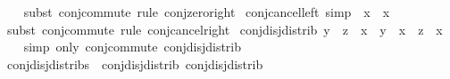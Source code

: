 \begin{isabellebody}
%
\isadelimproof
\ \ %
\endisadelimproof
%
\isatagproof
{}\isamarkupfalse%
\ {\isacharparenleft}{\kern0pt}subst\ conj{\isachardot}{\kern0pt}commute{\isacharparenright}{\kern0pt}\ {\isacharparenleft}{\kern0pt}rule\ conj{\isacharunderscore}{\kern0pt}zero{\isacharunderscore}{\kern0pt}right{\isacharparenright}{\kern0pt}%
\endisatagproof
{\isafoldproof}%
%
\isadelimproof
\isanewline
%
\endisadelimproof
\isanewline
{}\isamarkupfalse%
\ conj{\isacharunderscore}{\kern0pt}cancel{\isacharunderscore}{\kern0pt}left\ {\isacharbrackleft}{\kern0pt}simp{\isacharbrackright}{\kern0pt}{\isacharcolon}{\kern0pt}\ {\isachardoublequoteopen}\isactrlbold {\isacharminus}{\kern0pt}\ x\ \isactrlbold {\isasymsqinter}\ x\ {\isacharequal}{\kern0pt}\ \isanewline
%
\isadelimproof
\ \ %
\endisadelimproof
%
\isatagproof
{}\isamarkupfalse%
\ {\isacharparenleft}{\kern0pt}subst\ conj{\isachardot}{\kern0pt}commute{\isacharparenright}{\kern0pt}\ {\isacharparenleft}{\kern0pt}rule\ conj{\isacharunderscore}{\kern0pt}cancel{\isacharunderscore}{\kern0pt}right{\isacharparenright}{\kern0pt}%
\endisatagproof
{\isafoldproof}%
%
\isadelimproof
\isanewline
%
\endisadelimproof
\isanewline
{}\isamarkupfalse%
\ conj{\isacharunderscore}{\kern0pt}disj{\isacharunderscore}{\kern0pt}distrib{}{\isacharcolon}{\kern0pt}\ {\isachardoublequoteopen}{\isacharparenleft}{\kern0pt}y\ \isactrlbold {\isasymsqunion}\ z{\isacharparenright}{\kern0pt}\ \isactrlbold {\isasymsqinter}\ x\ {\isacharequal}{\kern0pt}\ {\isacharparenleft}{\kern0pt}y\ \isactrlbold {\isasymsqinter}\ x{\isacharparenright}{\kern0pt}\ \isactrlbold {\isasymsqunion}\ {\isacharparenleft}{\kern0pt}z\ \isactrlbold {\isasymsqinter}\ x{\isacharparenright}{\kern0pt}{\isachardoublequoteclose}\isanewline
%
\isadelimproof
\ \ %
\endisadelimproof
%
\isatagproof
{}\isamarkupfalse%
\ {\isacharparenleft}{\kern0pt}simp\ only{\isacharcolon}{\kern0pt}\ conj{\isachardot}{\kern0pt}commute\ conj{\isacharunderscore}{\kern0pt}disj{\isacharunderscore}{\kern0pt}distrib{\isacharparenright}{\kern0pt}%
\endisatagproof
{\isafoldproof}%
%
\isadelimproof
\isanewline
%
\endisadelimproof
\isanewline
{}\isamarkupfalse%
\ conj{\isacharunderscore}{\kern0pt}disj{\isacharunderscore}{\kern0pt}distribs\ {\isacharequal}{\kern0pt}\ conj{\isacharunderscore}{\kern0pt}disj{\isacharunderscore}{\kern0pt}distrib\ conj{\isacharunderscore}{\kern0pt}disj{\isacharunderscore}{\kern0pt}distrib{}%
\isadelimdocument
%
\endisadelimdocument
%
\isatagdocument

\end{isabellebody}
